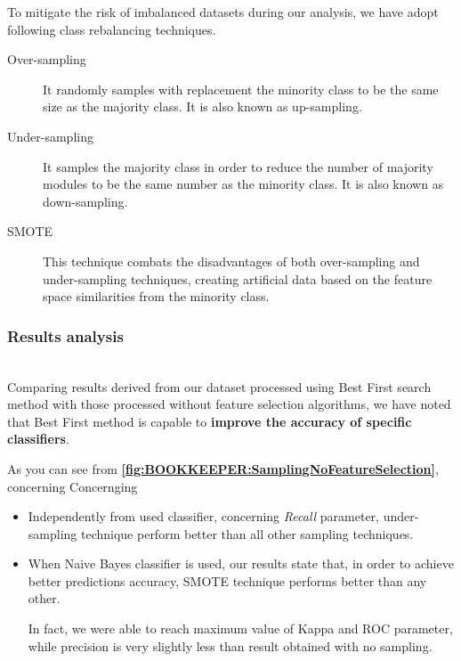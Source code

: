 \documentclass[sigconf]{acmart}
\begin{document}
To mitigate the risk of imbalanced datasets during our analysis, we have adopt following class rebalancing techniques.

\begin{description}
\item[Over-sampling] It randomly samples with replacement the minority class to be the same size as the majority class. It is also known as up-sampling.

\item[Under-sampling] It samples the majority class in order to reduce the number of majority modules to be the same number as the minority class. It is also known as down-sampling.

\item[SMOTE] This technique combats the disadvantages of both over-sampling and under-sampling techniques, creating artificial data based on the feature space similarities from the minority class. 

\end{description}

\subsubsection{Results analysis}
\hfill\\
Comparing results derived from our dataset processed using Best First search method with those processed without feature selection algorithms, we have noted that Best First method is capable to \textbf{improve the accuracy of specific classifiers}.

As you can see from \textbf{\cref{fig:BOOKKEEPER:SamplingNoFeatureSelection}}, concerning
Concernging 

\begin{itemize}
\item Independently from used classifier, concerning \textit{Recall} parameter, under-sampling technique perform better than all other sampling techniques.

\item When Naive Bayes classifier is used, our results state that, in order to achieve better predictions accuracy, SMOTE technique performs better than any other. 

In fact, we were able to reach maximum value of Kappa and ROC parameter, while precision is very slightly less than result obtained with no sampling. 

\end{itemize}
\end{document}
